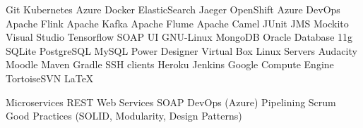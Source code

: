 \documentclass[]{CV-JuanCamiloFlorez}
\begin{document}
\begin{minipage}[t]{0.33\textwidth}
    \textbullet{} Git
    \textbullet{} Kubernetes
    \textbullet{} Azure
    \textbullet{} Docker
    \textbullet{} ElasticSearch
    \textbullet{} Jaeger
    \textbullet{} OpenShift
    \textbullet{} Azure DevOps
    \textbullet{} Apache Flink
    \textbullet{} Apache Kafka
    \textbullet{} Apache Flume
    \textbullet{} Apache Camel
    \textbullet{} JUnit
    \textbullet{} JMS
    \textbullet{} Mockito
    \textbullet{} Visual Studio
    \textbullet{} Tensorflow
    \textbullet{} SOAP UI
    \textbullet{} GNU-Linux
    \textbullet{} MongoDB
    \textbullet{} Oracle Database 11g
    \textbullet{} SQLite
    \textbullet{} PostgreSQL
    \textbullet{} MySQL
    \textbullet{} Power Designer
    \textbullet{} Virtual Box
    \textbullet{} Linux Servers
    \textbullet{} Audacity
    \textbullet{} Moodle
    \textbullet{} Maven
    \textbullet{} Gradle
    \textbullet{} SSH clients
    \textbullet{} Heroku
    \textbullet{} Jenkins
    \textbullet{} Google Compute Engine
    \textbullet{} TortoiseSVN
    \textbullet{} \LaTeX

    \textbullet{} Microservices
    \textbullet{} REST
    \textbullet{} Web Services
    \textbullet{} SOAP
    \textbullet{} DevOps (Azure)
    \textbullet{} Pipelining
    \textbullet{} Scrum
    \textbullet{} Good Practices (SOLID, Modularity, Design Patterns)


\sectionsep

%
%

\end{minipage} 
\hfill
\end{document}
